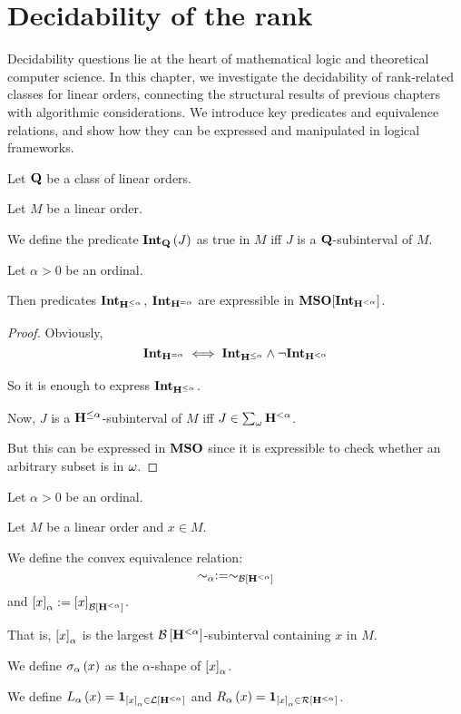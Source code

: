 \section{Decidability of the rank}

Decidability questions lie at the heart of mathematical logic and theoretical computer science. In this chapter, we investigate the decidability of rank-related classes for linear orders, connecting the structural results of previous chapters with algorithmic considerations. We introduce key predicates and equivalence relations, and show how they can be expressed and manipulated in logical frameworks.

\begin{definition}
  Let $\mathbf{Q}$ be a class of linear orders.

  Let $M$ be a linear order.

  We define the predicate $\mathbf{Int}_{\mathbf{Q}} \left( {J} \right)$ as
  true in $M$ iff $J$ is a $\mathbf{Q}$-subinterval of $M$.
\end{definition}

\begin{lemma}
  Let $\alpha > 0$ be an ordinal.

  Then predicates $\mathbf{Int}_{\mathbf{H}_{}^{\le \alpha}}$, $\mathbf{Int}_{\mathbf{H}_{}^{= \alpha}}$
  are expressible in $\mathbf{MSO}[\mathbf{Int}_{\mathbf{H}_{}^{< \alpha}}]$.
\end{lemma}

\begin{proof}
  Obviously, \[
    \mathbf{Int}_{\mathbf{H}_{}^{= \alpha}}
    \iff \mathbf{Int}_{\mathbf{H}_{}^{\le \alpha}} \wedge \neg \mathbf{Int}_{\mathbf{H}_{}^{< \alpha}}
  \]

  So it is enough to express $\mathbf{Int}_{\mathbf{H}_{}^{\le \alpha}}$.

  Now, $J$ is a $\mathbf{H}_{}^{\le \alpha}$-subinterval of $M$ iff
  $J \in \sum_{\omega}{\mathbf{H}_{}^{< \alpha}}$.

  But this can be expressed in $\mathbf{MSO}$ since it is expressible
  to check whether an arbitrary subset is in $\omega$.
\end{proof}

\begin{definition}
  Let $\alpha > 0$ be an ordinal.

  Let $M$ be a linear order and $x \in M$.

  We define the convex equivalence relation:
  \[\sim_\alpha := \sim_{\mathcal{B} \left[ {{\mathbf{H}_{}^{< \alpha}}} \right]}\]
  and $\left[ {x} \right]_{\alpha} := \left[ {x} \right]_{\mathcal{B} \left[ {{\mathbf{H}_{}^{< \alpha}}} \right]}$.

  That is,
  $\left[ {x} \right]_{\alpha}$ is the largest $\mathcal{B} \left[ {{\mathbf{H}_{}^{< \alpha}}} \right]$-subinterval
  containing $x$ in $M$.

  We define $\sigma_{\alpha} \left( {x} \right)$ as
  the $\alpha$-shape of $\left[ {x} \right]_{\alpha}$.

  We define
  $L_{\alpha} \left( {x} \right) = \mathbf{1}_{\left[ {x} \right]_{\alpha} \in \mathcal{L} \left[ {{\mathbf{H}_{}^{< \alpha}}} \right]}$ and
  $R_{\alpha} \left( {x} \right) = \mathbf{1}_{\left[ {x} \right]_{\alpha} \in \mathcal{R} \left[ {{\mathbf{H}_{}^{< \alpha}}} \right]}$.
\end{definition}

